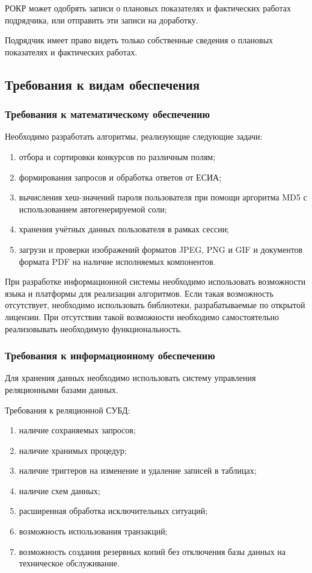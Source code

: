 РОКР может одобрять записи о плановых показателях и фактических работах подрядчика, или отправить эти записи на доработку.

Подрядчик имеет право видеть только собственные сведения о плановых показателях и фактических работах.

\subsection{Требования к видам обеспечения}

\subsubsection{Требования к математическому обеспечению}

Необходимо разработать алгоритмы, реализующие следующие задачи:

\begin{enumerate}
	\item отбора и сортировки конкурсов по различным полям;
	\item формирования запросов и обработка ответов от ЕСИА;
	\item вычисления хеш-значений пароля пользователя при помощи аргоритма MD5 с использованием автогенерируемой соли;
	\item хранения учётных данных пользователя в рамках сессии;
	\item загрузи и проверки изображений форматов JPEG, PNG и GIF и документов формата PDF на наличие исполняемых компонентов.
\end{enumerate}

При разработке информационной системы необходимо использовать возможности языка и платформы для реализации алгоритмов.
Если такая возможность отсутствует, необходимо использовать библиотеки, разрабатываемые по открытой лицензии.
При отсутствии такой возможности необходимо самостоятельно реализовывать необходимую функциональность.

\subsubsection{Требования к информационному обеспечению}

Для хранения данных необходимо использовать систему управления реляционными базами данных.

Требования к реляционной СУБД:
\begin{enumerate}
	\item наличие сохраняемых запросов;
	\item наличие хранимых процедур;
	\item наличие триггеров на изменение и удаление записей в таблицах;
	\item наличие схем данных;
	\item расширенная обработка исключительных ситуаций;
	\item возможность использования транзакций;
	\item возможность создания резервных копий без отключения базы данных на техническое обслуживание.
\end{enumerate}

